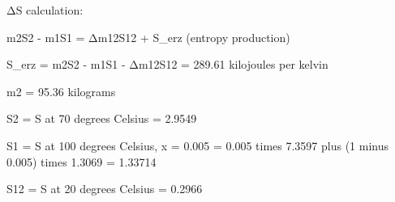 ΔS calculation:  

m2S2 - m1S1 = Δm12S12 + S_erz (entropy production)  

S_erz = m2S2 - m1S1 - Δm12S12  
= 289.61 kilojoules per kelvin  

m2 = 95.36 kilograms  

S2 = S at 70 degrees Celsius = 2.9549  

S1 = S at 100 degrees Celsius, x = 0.005  
= 0.005 times 7.3597 plus (1 minus 0.005) times 1.3069  
= 1.33714  

S12 = S at 20 degrees Celsius = 0.2966